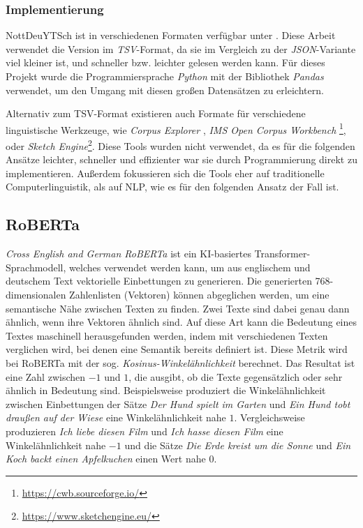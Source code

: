 \subsubsection{Implementierung}
NottDeuYTSch ist in verschiedenen Formaten verfügbar unter \textcite{Cot18}.
Diese Arbeit verwendet die Version im \emph{TSV}-Format, da sie im Vergleich zu der \emph{JSON}-Variante viel kleiner ist, und schneller bzw. leichter gelesen werden kann.
Für dieses Projekt wurde die Programmiersprache \emph{Python} mit der Bibliothek \emph{Pandas} verwendet, um den Umgang mit diesen großen Datensätzen zu erleichtern.

Alternativ zum TSV-Format existieren auch Formate für verschiedene linguistische Werkzeuge, wie \emph{Corpus Explorer} \autocite{Rüd22}, \emph{IMS Open Corpus Workbench} \footnote{\url{https://cwb.sourceforge.io/}}, oder \emph{Sketch Engine}\footnote{\url{https://www.sketchengine.eu/}}.
Diese Tools wurden nicht verwendet, da es für die folgenden Ansätze leichter, schneller und effizienter war sie durch Programmierung direkt zu implementieren.
Außerdem fokussieren sich die Tools eher auf traditionelle Computerlinguistik, als auf NLP, wie es für den folgenden Ansatz der Fall ist.

\subsection{RoBERTa} \label{subsec:2.2}
\emph{Cross English and German RoBERTa} \autocite{May20, RG19} ist ein KI-basiertes Transformer-Sprachmodell, welches verwendet werden kann, um aus englischem und deutschem Text vektorielle Einbettungen zu generieren.
Die generierten 768-dimensionalen Zahlenlisten (Vektoren) können abgeglichen werden, um eine semantische Nähe zwischen Texten zu finden.
Zwei Texte sind dabei genau dann ähnlich, wenn ihre Vektoren ähnlich sind.
Auf diese Art kann die Bedeutung eines Textes maschinell herausgefunden werden, indem mit verschiedenen Texten verglichen wird, bei denen eine Semantik bereits definiert ist.
Diese Metrik wird bei RoBERTa mit der sog. \emph{Kosinus-Winkelähnlichkeit} berechnet.
Das Resultat ist eine Zahl zwischen \(-1\) und \(1\), die ausgibt, ob die Texte gegensätzlich oder sehr ähnlich in Bedeutung sind.
Beispielsweise produziert die Winkelähnlichkeit zwischen Einbettungen der Sätze \emph{Der Hund spielt im Garten} und \emph{Ein Hund tobt draußen auf der Wiese} eine Winkelähnlichkeit nahe \(1\).
Vergleichsweise produzieren \emph{Ich liebe diesen Film} und \emph{Ich hasse diesen Film} eine Winkelähnlichkeit nahe \(-1\) und die Sätze \emph{Die Erde kreist um die Sonne} und \emph{Ein Koch backt einen Apfelkuchen} einen Wert nahe \(0\).

